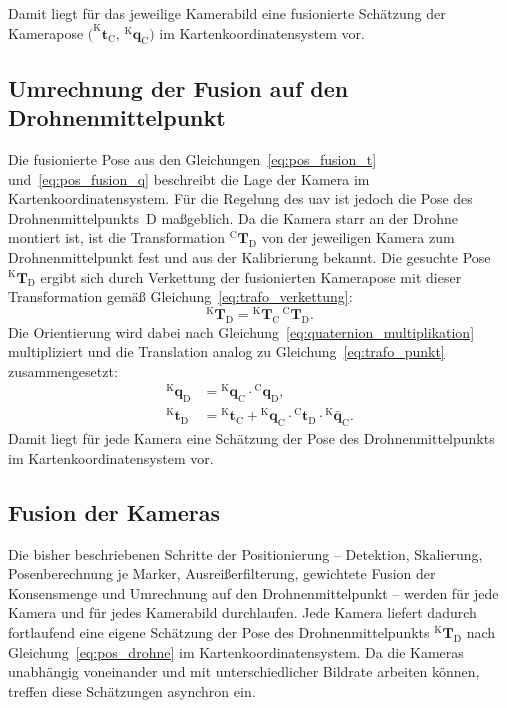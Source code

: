 Damit liegt für das jeweilige Kamerabild eine fusionierte Schätzung der 
Kamerapose $\bigl(^{\mathrm{K}}\mathbf{t}_{\mathrm{C}},\,{^{\mathrm{K}}\mathbf{q}_{\mathrm{C}}}\bigr)$ im Kartenkoordinatensystem vor.




\subsection{Umrechnung der Fusion auf den Drohnenmittelpunkt}
\label{subsec:pos_drohnenmittelpunkt}
Die fusionierte Pose aus den Gleichungen~\eqref{eq:pos_fusion_t} und~\eqref{eq:pos_fusion_q} beschreibt die Lage der Kamera im Kartenkoordinatensystem.
Für die Regelung des \gls{uav} ist jedoch die Pose des Drohnenmittelpunkts~$\mathrm{D}$ maßgeblich.
Da die Kamera starr an der Drohne montiert ist, ist die Transformation $^{\mathrm{C}}\mathbf{T}_{\mathrm{D}}$ 
von der jeweiligen Kamera zum Drohnenmittelpunkt fest und aus der Kalibrierung bekannt.
Die gesuchte Pose $^{\mathrm{K}}\mathbf{T}_{\mathrm{D}}$ ergibt sich durch Verkettung der fusionierten 
Kamerapose mit dieser Transformation gemäß Gleichung~\eqref{eq:trafo_verkettung}:
\begin{equation}
^{\mathrm{K}}\mathbf{T}_{\mathrm{D}} = {^{\mathrm{K}}\mathbf{T}_{\mathrm{C}}}\,{^{\mathrm{C}}\mathbf{T}_{\mathrm{D}}}.
\label{eq:pos_drohne}
\end{equation}
Die Orientierung wird dabei nach Gleichung~\eqref{eq:quaternion_multiplikation} multipliziert und die Translation analog zu Gleichung~\eqref{eq:trafo_punkt} zusammengesetzt:
\begin{align}
^{\mathrm{K}}\mathbf{q}_{\mathrm{D}} &= {^{\mathrm{K}}\mathbf{q}_{\mathrm{C}}} \cdot {^{\mathrm{C}}\mathbf{q}_{\mathrm{D}}}, \label{eq:pos_drohne_q}\\
^{\mathrm{K}}\mathbf{t}_{\mathrm{D}} &= {^{\mathrm{K}}\mathbf{t}_{\mathrm{C}}} + {^{\mathrm{K}}\mathbf{q}_{\mathrm{C}}} \cdot {^{\mathrm{C}}\mathbf{t}_{\mathrm{D}}} \cdot {^{\mathrm{K}}\bar{\mathbf{q}}_{\mathrm{C}}}.
\label{eq:pos_drohne_t}
\end{align}
Damit liegt für jede Kamera eine Schätzung der Pose des Drohnenmittelpunkts im Kartenkoordinatensystem vor.


\subsection{Fusion der Kameras}
\label{subsec:pos_kamerafusion}
Die bisher beschriebenen Schritte der Positionierung -- Detektion, Skalierung, Posenberechnung je Marker, Ausreißerfilterung, 
gewichtete Fusion der Konsensmenge und Umrechnung auf den Drohnenmittelpunkt -- werden für jede Kamera und für jedes Kamerabild durchlaufen.
Jede Kamera liefert dadurch fortlaufend eine eigene Schätzung der Pose des Drohnenmittelpunkts $^{\mathrm{K}}\mathbf{T}_{\mathrm{D}}$ 
nach Gleichung~\eqref{eq:pos_drohne} im Kartenkoordinatensystem.
Da die Kameras unabhängig voneinander und mit unterschiedlicher Bildrate arbeiten können, treffen diese Schätzungen asynchron ein.

